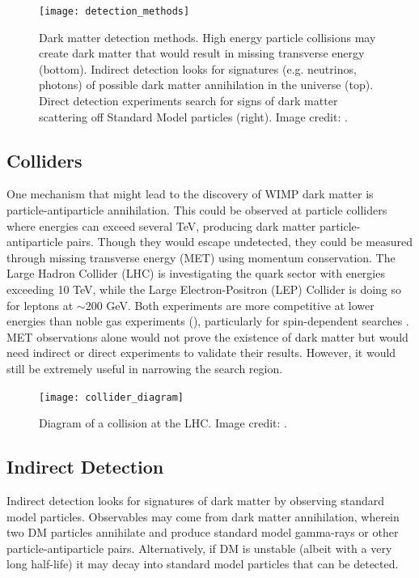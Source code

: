 \begin{figure}
\centering
\texttt{[image: detection\_methods]}
\caption{Dark matter detection methods.  High energy particle collisions may create dark matter that would result in missing transverse
energy (bottom).  Indirect detection looks for signatures (e.g. neutrinos, photons) of possible dark matter annihilation in the
universe (top).  Direct detection experiments search for signs of dark matter scattering off Standard Model particles (right).  Image
credit: .}
\label{fig:detection_methods}
\end{figure}

\subsection{Colliders} \label{subsec:colliders}
One mechanism that might lead to the discovery of WIMP dark matter is particle-antiparticle
annihilation.  This could be observed at particle colliders where energies can exceed
several TeV, producing dark matter particle-antiparticle pairs.  Though they would escape undetected, they could be measured through
missing transverse energy (MET) using momentum conservation.  The
Large Hadron Collider (LHC) is investigating the quark sector with energies
exceeding 10 TeV, while the Large Electron-Positron (LEP) Collider is doing so for leptons at
${\sim} 200$ GeV.  Both experiments are more competitive at lower energies than noble gas experiments (),
particularly for spin-dependent searches .  MET observations alone would not prove the existence of dark
matter but would need
indirect or direct experiments to validate their results.  However, it would still be extremely useful in narrowing the search region.

\begin{figure}
\centering
\texttt{[image: collider\_diagram]}
\caption{Diagram of a collision at the LHC.  Image credit: .}
\label{fig:collider}
\end{figure}


\subsection{Indirect Detection} \label{subsec:indirect}
Indirect detection looks for signatures of dark matter by observing standard model particles.  Observables
may come from dark matter annihilation, wherein two DM particles annihilate and produce standard model
gamma-rays or other particle-antiparticle pairs.  Alternatively, if DM is unstable (albeit with a very long half-life) it may decay into
standard model particles that can be detected.

